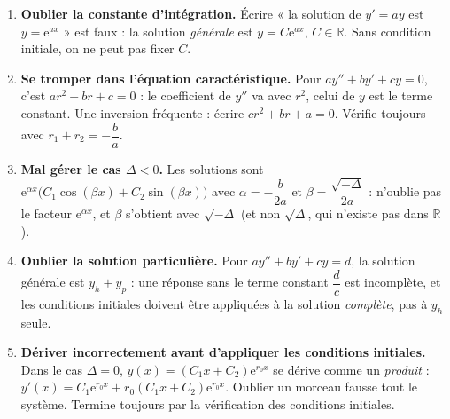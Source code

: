 \documentclass[11pt]{article}
\begin{document}
\begin{attention}
\begin{enumerate}
\item \textbf{Oublier la constante d'intégration.} Écrire « la solution de $y' = ay$ est $y = \mathrm{e}^{ax}$ » est faux : la solution \emph{générale} est $y = C\mathrm{e}^{ax}$, $C \in \mathbb{R}$. Sans condition initiale, on ne peut pas fixer $C$.
\item \textbf{Se tromper dans l'équation caractéristique.} Pour $ay'' + by' + cy = 0$, c'est $ar^2 + br + c = 0$ : le coefficient de $y''$ va avec $r^2$, celui de $y$ est le terme constant. Une inversion fréquente : écrire $cr^2 + br + a = 0$. Vérifie toujours avec $r_1 + r_2 = -\dfrac{b}{a}$.
\item \textbf{Mal gérer le cas $\Delta < 0$.} Les solutions sont $\mathrm{e}^{\alpha x}\bigl(C_1\cos(\beta x) + C_2\sin(\beta x)\bigr)$ avec $\alpha = -\dfrac{b}{2a}$ et $\beta = \dfrac{\sqrt{-\Delta}}{2a}$ : n'oublie pas le facteur $\mathrm{e}^{\alpha x}$, et $\beta$ s'obtient avec $\sqrt{-\Delta}$ (et non $\sqrt{\Delta}$, qui n'existe pas dans $\mathbb{R}$).
\item \textbf{Oublier la solution particulière.} Pour $ay'' + by' + cy = d$, la solution générale est $y_h + y_p$ : une réponse sans le terme constant $\dfrac{d}{c}$ est incomplète, et les conditions initiales doivent être appliquées à la solution \emph{complète}, pas à $y_h$ seule.
\item \textbf{Dériver incorrectement avant d'appliquer les conditions initiales.} Dans le cas $\Delta = 0$, $y(x) = (C_1 x + C_2)\mathrm{e}^{r_0 x}$ se dérive comme un \emph{produit} : $y'(x) = C_1\mathrm{e}^{r_0 x} + r_0(C_1 x + C_2)\mathrm{e}^{r_0 x}$. Oublier un morceau fausse tout le système. Termine toujours par la vérification des conditions initiales.
\end{enumerate}
\end{attention}
\end{document}
